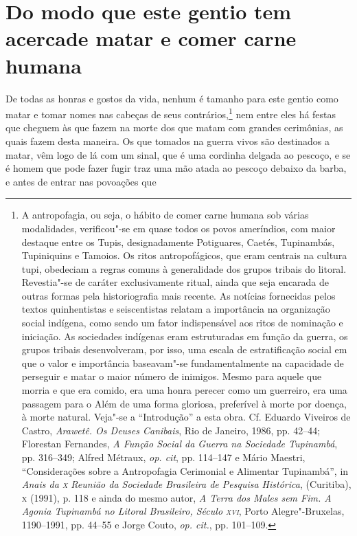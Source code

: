 \section[Do modo que este gentio tem acerca de matar e comer]{Do modo que este gentio tem acerca\break de matar e comer carne humana} 
De todas as honras e gostos da vida, nenhum é tamanho para
este gentio como matar e tomar nomes nas cabeças de seus 
contrários,\footnote{ A antropofagia, ou seja, o hábito de comer carne humana sob
várias modalidades, verificou"-se em quase todos os povos ameríndios,
com maior destaque entre os Tupis, designadamente Potiguares, Caetés,
Tupinambás, Tupiniquins e Tamoios. Os ritos antropofágicos, que eram
centrais na cultura tupi, obedeciam a regras comuns à generalidade dos
grupos tribais do litoral. Revestia"-se de caráter exclusivamente
ritual, ainda que seja encarada de outras formas pela historiografia
mais recente. As notícias fornecidas pelos textos quinhentistas e
seiscentistas relatam a importância na organização social indígena,
como sendo um fator indispensável aos ritos de nominação e iniciação.
As sociedades indígenas eram estruturadas em função da guerra, os
grupos tribais desenvolveram, por isso, uma escala de estratificação
social em que o valor e importância baseavam"-se fundamentalmente na
capacidade de perseguir e matar o maior número de inimigos. Mesmo para
aquele que morria e que era comido, era uma honra perecer como um
guerreiro, era uma passagem para o Além de uma forma gloriosa,
preferível à morte por doença, à morte natural. Veja"-se a ``Introdução''
a esta obra. Cf. Eduardo Viveiros de Castro, \textit{Arawetê. Os
Deuses Canibais}, Rio de Janeiro, 1986, pp. 42--44; Florestan Fernandes,
\textit{A Função Social da Guerra na Sociedade Tupinambá}, pp. 316--349;
Alfred Métraux, \textit{op. cit}, pp. 114--147 e Mário Maestri, ``Considerações 
sobre a Antropofagia Cerimonial e Alimentar Tupinambá'',
in \textit{Anais da \textsc{x} Reunião da Sociedade Brasileira de Pesquisa
Histórica}, (Curitiba), \textsc{x} (1991), p. 118 e ainda do mesmo autor,
\textit{A Terra dos Males sem Fim. A Agonia Tupinambá no Litoral
Brasileiro, Século \textsc{xvi}}, Porto Alegre"-Bruxelas, 1190--1991, pp. 44--55 e
Jorge Couto, \textit{op. cit.}, pp. 101--109.} nem entre eles há festas
que cheguem às que fazem na morte dos que matam com grandes cerimônias,
as quais fazem desta maneira. Os que tomados na guerra vivos são
destinados a matar, vêm logo de lá com um sinal, que é uma cordinha
delgada ao pescoço, e se é homem que pode fazer fugir traz uma mão
atada ao pescoço debaixo da barba, e antes de entrar nas povoações que
